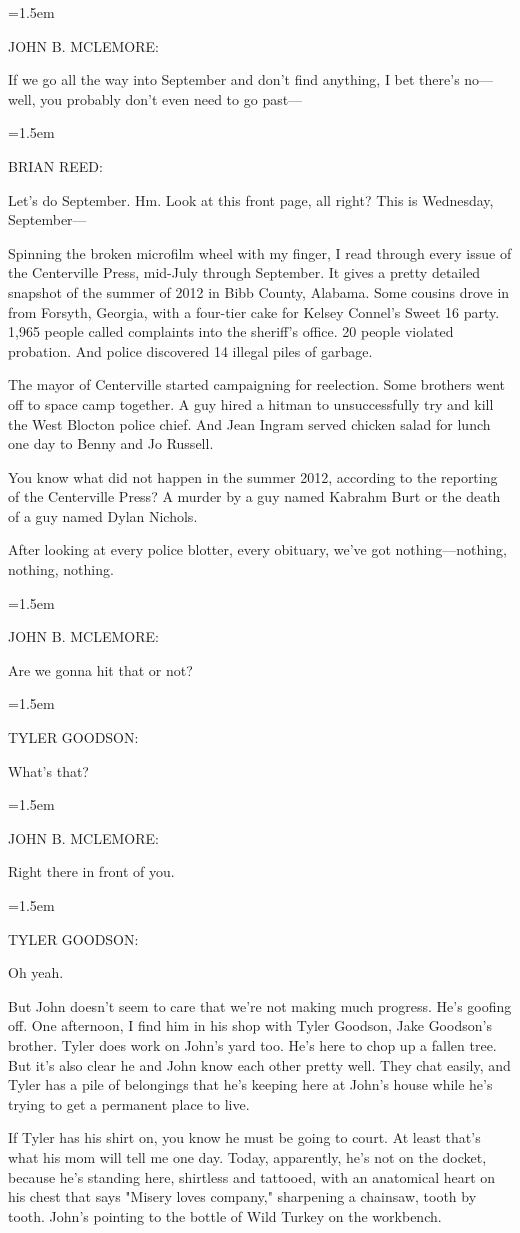 \documentclass[10pt,a4paper]{article}
\newcommand{\speakerlabel}[1]{{\plantin\color{speakerblue}\MakeUppercase{#1}:}}
\newenvironment{speech}[1]{%
		\par\medskip
		\begin{list}{}{%
			\leftmargin=1.5em
			\rightmargin=0pt
			\topsep=0pt
			\partopsep=0pt
			\parsep=0.5\baselineskip
			\itemsep=0pt}%
		\item\speakerlabel{#1}\enspace\ignorespaces
	}{\end{list}}
\newenvironment{narration}[1]{%
		\par\medskip\noindent\speakerlabel{#1}\enspace\ignorespaces
	}{\par\medskip}
\begin{document}
\begin{speech}{JOHN B. McLEMORE}
If we go all the way into September and don't find anything, I bet there's no—well, you probably don't even need to go past—
\end{speech}
\begin{speech}{BRIAN REED}
Let's do September. Hm. Look at this front page, all right? This is Wednesday, September—
\end{speech}
\begin{narration}{BRIAN REED}
Spinning the broken microfilm wheel with my finger, I read through every issue of the Centerville Press, mid-July through September. It gives a pretty detailed snapshot of the summer of 2012 in Bibb County, Alabama. Some cousins drove in from Forsyth, Georgia, with a four-tier cake for Kelsey Connel's Sweet 16 party. 1,965 people called complaints into the sheriff's office. 20 people violated probation. And police discovered 14 illegal piles of garbage.

The mayor of Centerville started campaigning for reelection. Some brothers went off to space camp together. A guy hired a hitman to unsuccessfully try and kill the West Blocton police chief. And Jean Ingram served chicken salad for lunch one day to Benny and Jo Russell.

You know what did not happen in the summer 2012, according to the reporting of the Centerville Press? A murder by a guy named Kabrahm Burt or the death of a guy named Dylan Nichols.

After looking at every police blotter, every obituary, we've got nothing—nothing, nothing, nothing.
\end{narration}
\begin{speech}{JOHN B. McLEMORE}
Are we gonna hit that or not?
\end{speech}
\begin{speech}{TYLER GOODSON}
What's that?
\end{speech}
\begin{speech}{JOHN B. McLEMORE}
Right there in front of you.
\end{speech}
\begin{speech}{TYLER GOODSON}
Oh yeah.
\end{speech}
\begin{narration}{BRIAN REED}
But John doesn't seem to care that we're not making much progress. He's goofing off. One afternoon, I find him in his shop with Tyler Goodson, Jake Goodson's brother. Tyler does work on John's yard too. He's here to chop up a fallen tree. But it's also clear he and John know each other pretty well. They chat easily, and Tyler has a pile of belongings that he's keeping here at John's house while he's trying to get a permanent place to live.

If Tyler has his shirt on, you know he must be going to court. At least that's what his mom will tell me one day. Today, apparently, he's not on the docket, because he's standing here, shirtless and tattooed, with an anatomical heart on his chest that says "Misery loves company," sharpening a chainsaw, tooth by tooth. John's pointing to the bottle of Wild Turkey on the workbench.
\end{narration}
\end{document}
